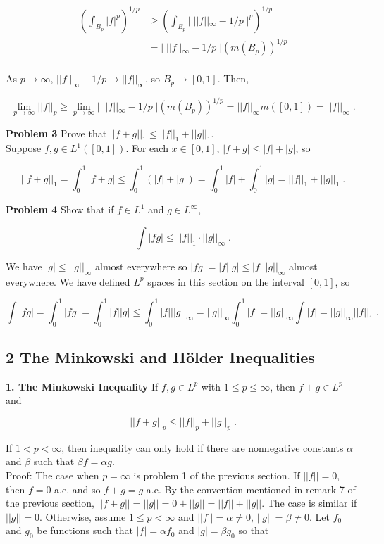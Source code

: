 \documentclass[a4paper]{article}
\begin{document}
\begin{align*}
\left(\int_{B_p} |f|^p \right)^{1/p}& \geq \left(\int_{B_p} |\;||f||_\infty - 1/p \;|^p\right)^{1/p}\\
&=| \; ||f||_\infty - 1/p \;| \left(m(B_p)\right)^{1/p}\\
\end{align*}

As $p \rightarrow \infty$, $||f||_\infty - 1/p \rightarrow ||f||_\infty$, so $B_p \rightarrow [0,1]$. Then,

$$\lim_{p \rightarrow \infty} ||f||_p \geq \lim_{p \rightarrow \infty} | \; ||f||_\infty - 1/p \; | \left(m(B_p)\right)^{1/p} = ||f||_\infty m([0,1]) = ||f||_\infty \;.$$


{\bf Problem 3} Prove that $||f + g||_1 \leq ||f||_1 + ||g||_1$. \\

Suppose $f,g \in L^1([0,1])$. For each $x \in [0,1]$, $|f+g| \leq |f| + |g|$, so

$$||f+g||_1 = \int_0^1 |f+g| \leq \int_0^1 (|f| + |g|)= \int_0^1 |f| + \int_0^1 |g|  = ||f||_1 + ||g||_1 \;.$$

{\bf Problem 4} Show that if $f \in L^1$ and $g \in L^\infty$,

$$\int |fg| \leq ||f||_1 \cdot ||g||_\infty \;.$$

We have $|g| \leq ||g||_\infty$ almost everywhere so $|fg| = |f||g| \leq |f| ||g||_\infty$ almost everywhere. We have defined $L^p$ spaces in this section on the interval $[0,1]$, so

$$\int |fg| = \int_0^1 |fg| = \int_0^1 |f||g| \leq \int_0^1 |f| ||g||_\infty = ||g||_\infty \int_0^1 |f| = ||g||_\infty \int |f| = ||g||_\infty ||f||_1 \;.$$



\subsection*{2 The Minkowski and Hölder Inequalities}

{\bf 1. The Minkowski Inequality} If $f,g \in L^p$ with $1\leq p \leq \infty$, then $f+g \in L^p$ and

$$||f + g||_p \leq ||f||_p + ||g||_p \;.$$

If $1<p<\infty$, then inequality can only hold if there are nonnegative constants $\alpha$ and $\beta$ such that $\beta f = \alpha g$.\\

Proof: The case when $p = \infty$ is problem 1 of the previous section. If $||f|| = 0$, then $f = 0$ a.e. and so $f+g = g$ a.e. By the convention mentioned in remark 7 of the previous section, $||f+g|| = ||g|| = 0 + ||g|| = ||f|| + ||g||$. The case is similar if $||g|| = 0$. Otherwise, assume $1\leq p < \infty$ and $||f|| = \alpha \neq 0$, $||g|| = \beta \neq 0$. Let $f_0$ and $g_0$ be functions such that $|f| = \alpha f_0$ and $|g| = \beta g_0$ so that
\end{document}
